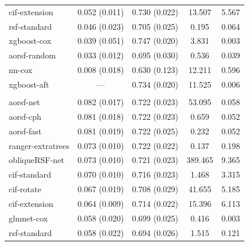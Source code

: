 \documentclass{article}\usepackage[]{graphicx}\usepackage[]{xcolor}
\newenvironment{knitrout}{}{} %
\begin{document}
\begin{knitrout}
\begin{longtable}[t]{lcccc}
\hspace{1em}cif-extension & 0.052 (0.011) & 0.730 (0.022) & 13.507 & 5.567\\
\hspace{1em}rsf-standard & 0.046 (0.023) & 0.705 (0.025) & 0.195 & 0.064\\
\hspace{1em}xgboost-cox & 0.039 (0.051) & 0.747 (0.020) & 3.831 & 0.003\\
\hspace{1em}aorsf-random & 0.033 (0.012) & 0.695 (0.030) & 0.536 & 0.039\\
\hspace{1em}nn-cox & 0.008 (0.018) & 0.630 (0.123) & 12.211 & 0.596\\
\hspace{1em}xgboost-aft & --- & 0.734 (0.020) & 11.525 & 0.006\\
\addlinespace[0.3em]
\multicolumn{5}{l}{\textit{\textbf{GUIDE-IT; HF hospitalization, n = 894, p = 59}}}\\
\hline
\hspace{1em}aorsf-net & 0.082 (0.017) & 0.722 (0.023) & 53.095 & 0.058\\
\hspace{1em}aorsf-cph & 0.081 (0.018) & 0.722 (0.023) & 0.659 & 0.052\\
\hspace{1em}aorsf-fast & 0.081 (0.019) & 0.722 (0.025) & 0.232 & 0.052\\
\hspace{1em}ranger-extratrees & 0.073 (0.010) & 0.722 (0.022) & 0.137 & 0.198\\
\hspace{1em}obliqueRSF-net & 0.073 (0.010) & 0.721 (0.023) & 389.465 & 9.365\\
\hspace{1em}cif-standard & 0.070 (0.010) & 0.716 (0.023) & 1.468 & 3.315\\
\hspace{1em}cif-rotate & 0.067 (0.019) & 0.708 (0.029) & 41.655 & 5.185\\
\hspace{1em}cif-extension & 0.064 (0.009) & 0.714 (0.022) & 15.396 & 6.113\\
\hspace{1em}glmnet-cox & 0.058 (0.020) & 0.699 (0.025) & 0.416 & 0.003\\
\hspace{1em}rsf-standard & 0.058 (0.022) & 0.694 (0.026) & 1.515 & 0.121\\

\end{longtable}
\end{knitrout}
\end{document}

